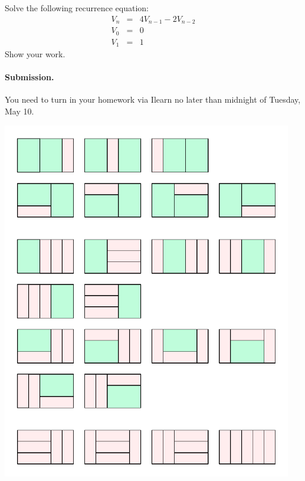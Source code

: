 \documentclass{article}
\begin{document}

\begin{problem}
Solve the following recurrence equation:
%
\begin{eqnarray*}
        V_n &=& 4V_{n-1} - 2V_{n-2}\\
        V_0 &=& 0 \\
        V_1 &=& 1
\end{eqnarray*}
%
Show your work.
\end{problem}

\vskip 0.1in
\paragraph{Submission.}
You need to turn in your homework via Ilearn
no later than midnight of Tuesday, May 10.


\vfill
\eject

\begin{center}
\includegraphics[width=5in]{hw3_tilings.pdf}
\end{center}
\end{document}
